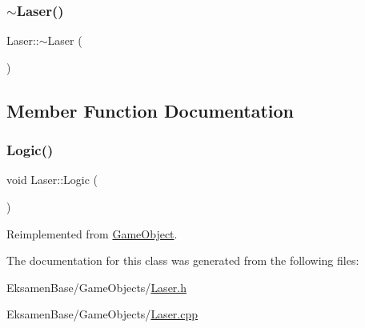 \mbox{\label{class_laser_aa9baee5ed9775426e0b1d563c4687711}} 
\subsubsection{\texorpdfstring{$\sim$\+Laser()}{~Laser()}}
{\footnotesize\ttfamily Laser\+::$\sim$\+Laser (\begin{DoxyParamCaption}{ }\end{DoxyParamCaption})}



\subsection{Member Function Documentation}
\mbox{\label{class_laser_a1f2135281ecc1b318357633f4e7dd34c}} 
\subsubsection{\texorpdfstring{Logic()}{Logic()}}
{\footnotesize\ttfamily void Laser\+::\+Logic (\begin{DoxyParamCaption}{ }\end{DoxyParamCaption})\hspace{0.3cm}{\ttfamily [virtual]}}



Reimplemented from \mbox{\hyperlink{class_game_object_a79510ffc77339fe850491dce9f580fa9}{Game\+Object}}.



The documentation for this class was generated from the following files\+:\begin{DoxyCompactItemize}
\item 
Eksamen\+Base/\+Game\+Objects/\mbox{\hyperlink{_laser_8h}{Laser.\+h}}\item 
Eksamen\+Base/\+Game\+Objects/\mbox{\hyperlink{_laser_8cpp}{Laser.\+cpp}}\end{DoxyCompactItemize}
